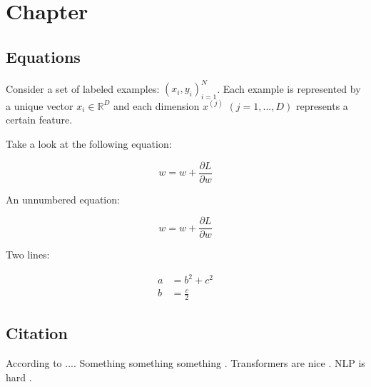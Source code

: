 \chapter{Chapter}

\section{Equations}
    
Consider a set of labeled examples: ${(x_i, y_i)}^N_{i=1}$. Each example is represented by a unique vector $x_i \in \mathbb{R}^D $ and each dimension  $x^{(j)}$ $(j = 1, ..., D)$ represents a certain feature.
        
Take a look at the following equation:
        
\begin{equation}
    w = w+\frac{\partial L}{\partial w}
\end{equation}
        
\noindent An unnumbered equation:
        
\begin{equation*}
    w = w+\frac{\partial L}{\partial w}
\end{equation*}
        
\noindent Two lines:
        
\begin{equation}
    \begin{aligned}
        a &= b^2+c^2 \\
        b &= \frac{c}{2}
    \end{aligned}
\end{equation}
        
\section{Citation}
        
According to \textcite{dirac} .... Something something something \parencite[p. 15]{einstein}. Transformers are nice \parencite{attention}. NLP is hard \parencite[p. 33]{goldberg}.
